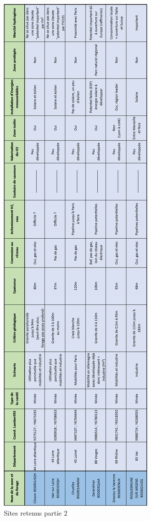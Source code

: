 \documentclass[11pt,french,a4paper]{article}
\begin{document}
\begin{figure}[h]
\centering
\includegraphics[width=\textwidth,height=\textheight,keepaspectratio]{image/annexe/chap4/sites_2.png}
\caption{Sites retenus partie 2}
\end{figure}
\end{document}
